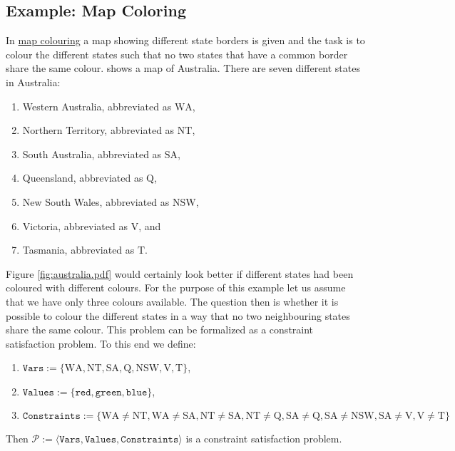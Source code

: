 \subsection{Example: Map Coloring}
In \href{https://en.wikipedia.org/wiki/Four_color_theorem}{map colouring} a map showing different state
borders is given and the task is to colour the different states such that no two states that have a common
border share the same colour.   shows a map of Australia.  There are seven different
states in Australia:
\begin{enumerate}
\item Western Australia, abbreviated as $\mathrm{WA}$,
\item Northern Territory, abbreviated as $\mathrm{NT}$,
\item South Australia, abbreviated as $\mathrm{SA}$,
\item Queensland, abbreviated as $\mathrm{Q}$,
\item New South Wales, abbreviated as $\mathrm{NSW}$,
\item Victoria, abbreviated as $\mathrm{V}$, and
\item Tasmania, abbreviated as $\mathrm{T}$.
\end{enumerate}
Figure \ref{fig:australia.pdf} would certainly look better if different states had been coloured with different
colours.  For the purpose of 
this example let us assume that we have only three colours available.  The question then is whether it is 
possible to colour the different states in a way that no two neighbouring states share the same colour.  This
problem can be formalized as a constraint satisfaction problem.  To this end we define:
\begin{enumerate}
\item $\mathtt{Vars} := \{ \mathrm{WA}, \mathrm{NT}, \mathrm{SA}, \mathrm{Q}, \mathrm{NSW}, \mathrm{V}, \mathrm{T} \}$,
\item $\mathtt{Values} := \{ \mathtt{red}, \mathtt{green}, \mathtt{blue} \}$,
\item $\mathtt{Constraints} := 
         \bigl\{ \mathrm{WA} \not= \mathrm{NT}, \mathrm{WA} \not= \mathrm{SA},
                 \mathrm{NT} \not= \mathrm{SA}, \mathrm{NT} \not= \mathrm{Q},
                 \mathrm{SA} \not= \mathrm{Q}, \mathrm{SA} \not= \mathrm{NSW}, \mathrm{SA} \not= \mathrm{V}, 
                 \mathrm{V} \not = \mathrm{T}
         \bigr\}
        $
\end{enumerate}
Then $\mathcal{P} := \langle \mathtt{Vars}, \mathtt{Values}, \mathtt{Constraints} \rangle$ is a constraint satisfaction problem.  
